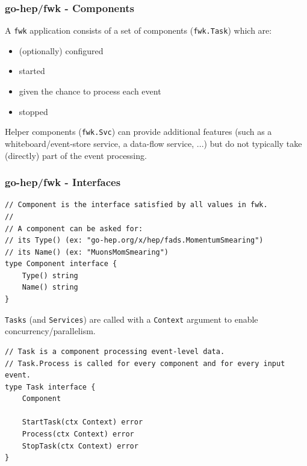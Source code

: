 \documentclass[9pt]{beamer}
\begin{document}
\begin{frame}[fragile]
\frametitle{go-hep/fwk - Components}


A \texttt{fwk} application consists of a set of components (\texttt{fwk.Task}) which are:


\begin{itemize}
\item (optionally) configured
\item started
\item given the chance to process each event
\item stopped
\end{itemize}

Helper components (\texttt{fwk.Svc}) can provide additional features (such as a whiteboard/event-store service, a data-flow service, ...) but do not typically take (directly) part of the event processing.



\end{frame}

\begin{frame}[fragile]
\frametitle{go-hep/fwk - Interfaces}


\begin{verbatim}
// Component is the interface satisfied by all values in fwk.
//
// A component can be asked for:
// its Type() (ex: "go-hep.org/x/hep/fads.MomentumSmearing")
// its Name() (ex: "MuonsMomSmearing")
type Component interface {
	Type() string
	Name() string
}
\end{verbatim}

\texttt{Tasks} (and \texttt{Services}) are called with a \texttt{Context} argument to enable concurrency/parallelism.


\begin{verbatim}
// Task is a component processing event-level data.
// Task.Process is called for every component and for every input event.
type Task interface {
	Component

	StartTask(ctx Context) error
	Process(ctx Context) error
	StopTask(ctx Context) error
}
\end{verbatim}


\end{frame}
\end{document}

